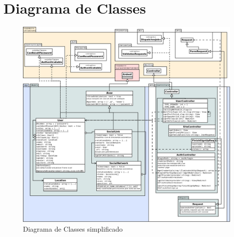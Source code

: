 \documentclass[12pt,a4paper,twoside,hyphens,english,brazil]{abntex2}
\begin{document}
{\clearpage {} \recalctypearea

	\chapter{Diagrama de Classes} \label{apend:classes}
	\begin{figure}[h!]
		\centering
		\includegraphics[width=1\linewidth]{diagramas/classes.png}
		\caption{Diagrama de Classes simplificado}
	\end{figure}

	\clearpage
}
\end{document}
